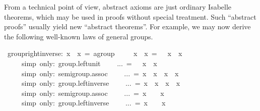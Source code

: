 \begin{isabelle}
\begin{isamarkuptext}
 \medskip From a technical point of view, abstract axioms are just
 ordinary Isabelle theorems, which may be used in proofs without
 special treatment.  Such ``abstract proofs'' usually yield new
 ``abstract theorems''.  For example, we may now derive the following
 well-known laws of general groups.%
\end{isamarkuptext}%
\ group{\isacharunderscore}right{\isacharunderscore}inverse:\ {\isachardoublequote}x\ {\isasymOtimes}\ x{\isasyminv}\ =\ {\isacharparenleft}{\isasymunit}{\isasymColon}{\isacharprime}a{\isasymColon}group{\isacharparenright}{\isachardoublequote}\isanewline
{}\ {\isacharminus}\isanewline
\ \ \ {\isachardoublequote}x\ {\isasymOtimes}\ x{\isasyminv}\ =\ {\isasymunit}\ {\isasymOtimes}\ {\isacharparenleft}x\ {\isasymOtimes}\ x{\isasyminv}{\isacharparenright}{\isachardoublequote}\isanewline
\ \ \ \ \ {\isacharparenleft}simp\ only:\ group.left{\isacharunderscore}unit{\isacharparenright}\isanewline
\ \ \ \ {\isachardoublequote}...\ =\ {\isasymunit}\ {\isasymOtimes}\ x\ {\isasymOtimes}\ x{\isasyminv}{\isachardoublequote}\isanewline
\ \ \ \ \ {\isacharparenleft}simp\ only:\ semigroup.assoc{\isacharparenright}\isanewline
\ \ \ \ {\isachardoublequote}...\ =\ {\isacharparenleft}x{\isasyminv}{\isacharparenright}{\isasyminv}\ {\isasymOtimes}\ x{\isasyminv}\ {\isasymOtimes}\ x\ {\isasymOtimes}\ x{\isasyminv}{\isachardoublequote}\isanewline
\ \ \ \ \ {\isacharparenleft}simp\ only:\ group.left{\isacharunderscore}inverse{\isacharparenright}\isanewline
\ \ \ \ {\isachardoublequote}...\ =\ {\isacharparenleft}x{\isasyminv}{\isacharparenright}{\isasyminv}\ {\isasymOtimes}\ {\isacharparenleft}x{\isasyminv}\ {\isasymOtimes}\ x{\isacharparenright}\ {\isasymOtimes}\ x{\isasyminv}{\isachardoublequote}\isanewline
\ \ \ \ \ {\isacharparenleft}simp\ only:\ semigroup.assoc{\isacharparenright}\isanewline
\ \ \ \ {\isachardoublequote}...\ =\ {\isacharparenleft}x{\isasyminv}{\isacharparenright}{\isasyminv}\ {\isasymOtimes}\ {\isasymunit}\ {\isasymOtimes}\ x{\isasyminv}{\isachardoublequote}\isanewline
\ \ \ \ \ {\isacharparenleft}simp\ only:\ group.left{\isacharunderscore}inverse{\isacharparenright}\isanewline
\ \ \ \ {\isachardoublequote}...\ =\ {\isacharparenleft}x{\isasyminv}{\isacharparenright}{\isasyminv}\ {\isasymOtimes}\ {\isacharparenleft}{\isasymunit}\ {\isasymOtimes}\ x{\isasyminv}{\isacharparenright}{\isachardoublequote}\isanewline

\end{isabelle}
